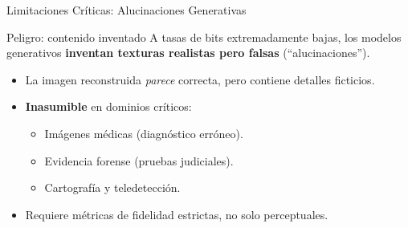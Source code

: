 \begin{frame}{Limitaciones Críticas: Alucinaciones Generativas}
\begin{alertblock}{Peligro: contenido inventado}
A tasas de bits extremadamente bajas, los modelos generativos \textbf{inventan texturas realistas pero falsas} (``alucinaciones'').
\end{alertblock}
\begin{itemize}
    \item La imagen reconstruida \textit{parece} correcta, pero contiene detalles ficticios.
    \item \textbf{Inasumible} en dominios críticos:
    \begin{itemize}
        \item Imágenes médicas (diagnóstico erróneo).
        \item Evidencia forense (pruebas judiciales).
        \item Cartografía y teledetección.
    \end{itemize}
    \item Requiere métricas de fidelidad estrictas, no solo perceptuales.
\end{itemize}
\end{frame}

